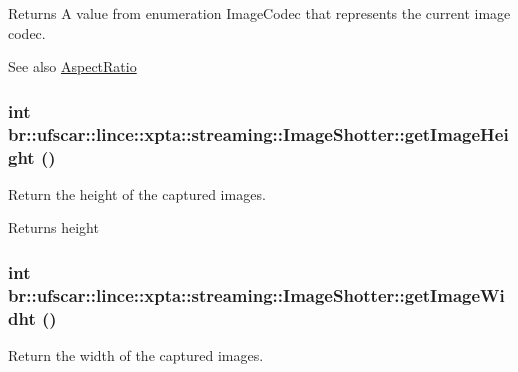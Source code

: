 \begin{DoxyReturn}{Returns}
A value from enumeration ImageCodec that represents the current image codec. 
\end{DoxyReturn}
\begin{DoxySeeAlso}{See also}
\hyperlink{namespacebr_1_1ufscar_1_1lince_1_1xpta_1_1streaming_a252e3034c41c058052743c39f2e66103}{AspectRatio} 
\end{DoxySeeAlso}
\hypertarget{classbr_1_1ufscar_1_1lince_1_1xpta_1_1streaming_1_1ImageShotter_a792e9f6fef3a213c993b5707ad0ccfdf}{
\subsubsection[{getImageHeight}]{\setlength{\rightskip}{0pt plus 5cm}int br::ufscar::lince::xpta::streaming::ImageShotter::getImageHeight ()}}
\label{classbr_1_1ufscar_1_1lince_1_1xpta_1_1streaming_1_1ImageShotter_a792e9f6fef3a213c993b5707ad0ccfdf}


Return the height of the captured images. 

\begin{DoxyReturn}{Returns}
height 
\end{DoxyReturn}
\hypertarget{classbr_1_1ufscar_1_1lince_1_1xpta_1_1streaming_1_1ImageShotter_afe99a0aec363646190f8f416f6ac7139}{
\subsubsection[{getImageWidht}]{\setlength{\rightskip}{0pt plus 5cm}int br::ufscar::lince::xpta::streaming::ImageShotter::getImageWidht ()}}
\label{classbr_1_1ufscar_1_1lince_1_1xpta_1_1streaming_1_1ImageShotter_afe99a0aec363646190f8f416f6ac7139}


Return the width of the captured images. 

